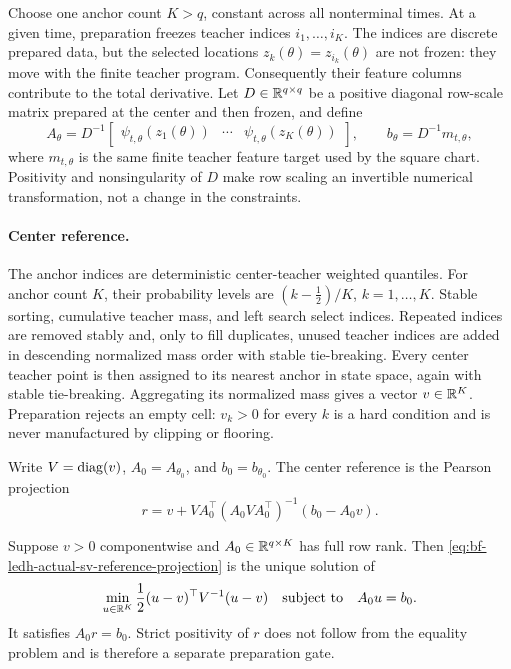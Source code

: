 Choose one anchor count \(K>q\), constant across all nonterminal times.  At a
given time, preparation freezes teacher indices \(i_1,\ldots,i_K\).  The
indices are discrete prepared data, but the selected locations
\(z_k(\theta)=z_{i_k}(\theta)\) are not frozen: they move with the finite
teacher program.  Consequently their feature columns contribute to the total
derivative.  Let \(D\in\mathbb{R}^{q\times q}\) be a positive diagonal row-scale
matrix prepared at the center and then frozen, and define
\begin{equation}
\label{eq:bf-ledh-actual-sv-scaled-system}
  A_\theta=D^{-1}
  \begin{bmatrix}
    \psi_{t,\theta}(z_1(\theta))&\cdots&
    \psi_{t,\theta}(z_K(\theta))
  \end{bmatrix},
  \qquad
  b_\theta=D^{-1}m_{t,\theta},
\end{equation}
where \(m_{t,\theta}\) is the same finite teacher feature target used by the
square chart.  Positivity and nonsingularity of \(D\) make row scaling an
invertible numerical transformation, not a change in the constraints.

\paragraph{Center reference.}
The anchor indices are deterministic center-teacher weighted quantiles.  For
anchor count \(K\), their probability levels are
\((k-\tfrac12)/K\), \(k=1,\ldots,K\).  Stable sorting, cumulative teacher mass,
and left search select indices.  Repeated indices are removed stably and, only
to fill duplicates, unused teacher indices are added in descending normalized
mass order with stable tie-breaking.  Every center teacher point is then
assigned to its nearest anchor in state space, again with stable tie-breaking.
Aggregating its normalized mass gives a vector \(v\in\mathbb{R}^K\).  Preparation
rejects an empty cell: \(v_k>0\) for every \(k\) is a hard condition and is
never manufactured by clipping or flooring.

Write \(V=\operatorname{diag}(v)\), \(A_0=A_{\theta_0}\), and \(b_0=b_{\theta_0}\).  The
center reference is the Pearson projection
\begin{equation}
\label{eq:bf-ledh-actual-sv-reference-projection}
  r=v+VA_0^\top(A_0VA_0^\top)^{-1}(b_0-A_0v).
\end{equation}

\begin{proposition}
\label{prop:bf-ledh-actual-sv-reference-projection}
Suppose \(v>0\) componentwise and \(A_0\in\mathbb{R}^{q\times K}\) has full row rank.
Then \eqref{eq:bf-ledh-actual-sv-reference-projection} is the unique solution of
\begin{equation}
\label{eq:bf-ledh-actual-sv-reference-program}
  \min_{u\in\mathbb{R}^K}
  \frac12(u-v)^\top V^{-1}(u-v)
  \quad\text{subject to}\quad A_0u=b_0.
\end{equation}
It satisfies \(A_0r=b_0\).  Strict positivity of \(r\) does not follow from the
equality problem and is therefore a separate preparation gate.
\end{proposition}

